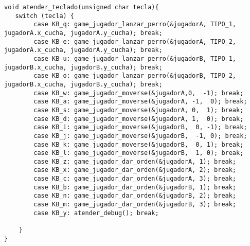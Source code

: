 \begin{codesnippet}
\begin{verbatim}
void atender_teclado(unsigned char tecla){
   switch (tecla) {
        case KB_q: game_jugador_lanzar_perro(&jugadorA, TIPO_1, jugadorA.x_cucha, jugadorA.y_cucha); break;
        case KB_e: game_jugador_lanzar_perro(&jugadorA, TIPO_2, jugadorA.x_cucha, jugadorA.y_cucha); break;
        case KB_u: game_jugador_lanzar_perro(&jugadorB, TIPO_1, jugadorB.x_cucha, jugadorB.y_cucha); break;
        case KB_o: game_jugador_lanzar_perro(&jugadorB, TIPO_2, jugadorB.x_cucha, jugadorB.y_cucha); break;
        case KB_w: game_jugador_moverse(&jugadorA,0,  -1); break;
        case KB_a: game_jugador_moverse(&jugadorA, -1,  0); break;
        case KB_s: game_jugador_moverse(&jugadorA, 0,  1); break;
        case KB_d: game_jugador_moverse(&jugadorA, 1,  0); break;
        case KB_i: game_jugador_moverse(&jugadorB,  0, -1); break;
        case KB_j: game_jugador_moverse(&jugadorB,  -1, 0); break;
        case KB_k: game_jugador_moverse(&jugadorB,  0, 1); break;
        case KB_l: game_jugador_moverse(&jugadorB,  1, 0); break;
        case KB_z: game_jugador_dar_orden(&jugadorA, 1); break;
        case KB_x: game_jugador_dar_orden(&jugadorA, 2); break;
        case KB_c: game_jugador_dar_orden(&jugadorA, 3); break;
        case KB_b: game_jugador_dar_orden(&jugadorB, 1); break;
        case KB_n: game_jugador_dar_orden(&jugadorB, 2); break;
        case KB_m: game_jugador_dar_orden(&jugadorB, 3); break;
        case KB_y: atender_debug(); break;	
	
    }
}

\end{verbatim}
\end{codesnippet}
